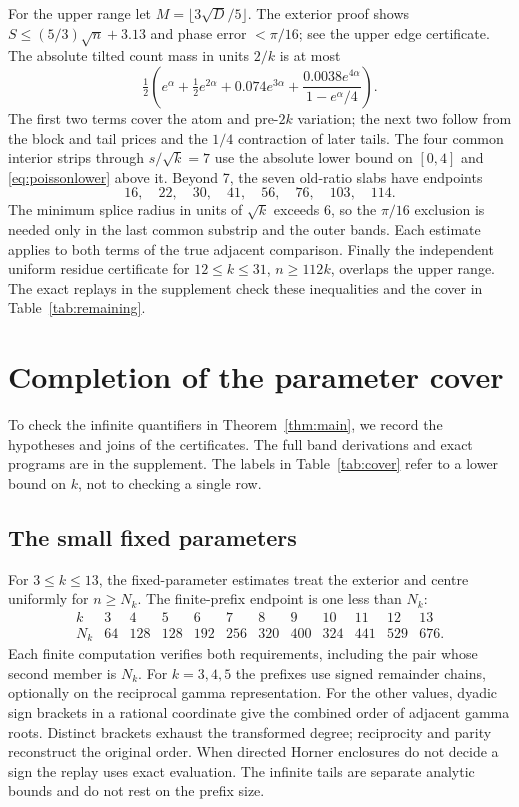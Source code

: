 \documentclass[11pt,reqno]{amsart}
\theoremstyle{remark}
\begin{document}
For the upper range let $M=\lfloor 3\sqrt D/5\rfloor$. The exterior proof shows $S\le(5/3)\sqrt n+3.13$ and phase error $<\pi/16$; see the upper edge certificate. The absolute tilted count mass in units $2/k$ is at most
\[
 \tfrac12\left(e^\alpha+\tfrac12 e^{2\alpha}
      +0.074 e^{3\alpha}+
      \frac{0.0038 e^{4\alpha}}{1-e^\alpha/4}\right).
\]
The first two terms cover the atom and pre-$2k$ variation; the next two follow from the block and tail prices and the $1/4$ contraction of later tails. The four common interior strips through $s/\sqrt{k}=7$ use the absolute lower bound on $[0,4]$ and \eqref{eq:poissonlower} above it. Beyond 7, the seven old-ratio slabs have endpoints
\[
 16,\quad22,\quad30,\quad41,\quad56,\quad76,\quad103,\quad114.
\]
The minimum splice radius in units of $\sqrt{k}$ exceeds 6, so the $\pi/16$ exclusion is needed only in the last common substrip and the outer bands. Each estimate applies to both terms of the true adjacent comparison. Finally the independent uniform residue certificate for $12\le k\le31$, $n\ge112k$, overlaps the upper range. The exact replays in the supplement check these inequalities and the cover in Table~\ref{tab:remaining}.

\section{Completion of the parameter cover}\label{sec:coverage}
To check the infinite quantifiers in Theorem~\ref{thm:main}, we record the hypotheses and joins of the certificates. The full band derivations and exact programs are in the supplement. The labels in Table~\ref{tab:cover} refer to a lower bound on $k$, not to checking a single row.

\subsection{The small fixed parameters}
For $3\le k\le13$, the fixed-parameter estimates treat the exterior and centre uniformly for $n\ge N_k$. The finite-prefix endpoint is one less than $N_k$:
\[
\begin{array}{c|rrrrrrrrrrr}
k&3&4&5&6&7&8&9&10&11&12&13\\ \hline
N_k&64&128&128&192&256&320&400&324&441&529&676 .
\end{array}
\]
Each finite computation verifies both requirements, including the pair whose second member is $N_k$. For $k=3,4,5$ the prefixes use signed remainder chains, optionally on the reciprocal gamma representation. For the other values, dyadic sign brackets in a rational coordinate give the combined order of adjacent gamma roots. Distinct brackets exhaust the transformed degree; reciprocity and parity reconstruct the original order. When directed Horner enclosures do not decide a sign the replay uses exact evaluation. The infinite tails are separate analytic bounds and do not rest on the prefix size.
\end{document}
